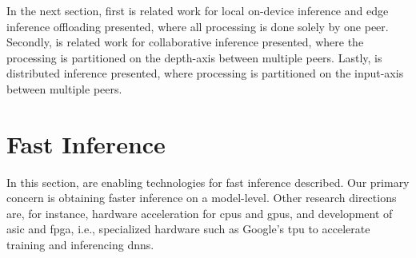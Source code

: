 In the next section, first is related work for local on-device inference and edge inference offloading presented, where all processing is done solely by one peer. Secondly, is related work for collaborative inference presented, where the processing is partitioned on the depth-axis between multiple peers. Lastly, is distributed inference presented, where processing is partitioned on the input-axis between multiple peers. 
\section{Fast Inference} \label{sec:ei-fast-inference}
In this section, are enabling technologies for fast inference described. Our primary concern is obtaining faster inference on a model-level. Other research directions are, for instance, hardware acceleration for \gls{cpu}s and \gls{gpu}s, and development of \gls{asic} and \gls{fpga}, i.e., specialized hardware such as Google's \gls{tpu} to accelerate training and inferencing \gls{dnn}s. 

